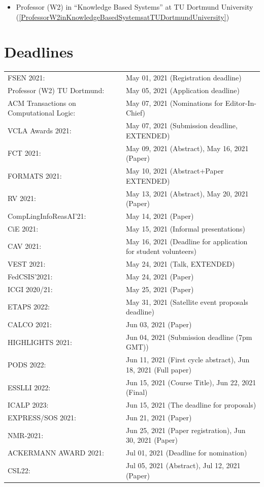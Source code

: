 \documentclass[prodmode,acmtecs]{acmsmall} %
\begin{document}
\begin{itemize}
\begin{itemize}\item Professor (W2) in “Knowledge Based Systems” at TU Dortmund University (\cref{ProfessorW2inKnowledgeBasedSystemsatTUDortmundUniversity})
\end{itemize} 
\end{itemize}\section{Deadlines}\label{deadlines}\begin{tabulary}{\linewidth}{LL}FSEN 2021:  & May 01, 2021 (Registration deadline) \\
Professor (W2) TU Dortmund:  & May 05, 2021 (Application deadline) \\
ACM Transactions on Computational Logic:  & May 07, 2021 (Nominations for Editor-In-Chief) \\
VCLA Awards 2021:  & May 07, 2021 (Submission deadline, EXTENDED) \\
FCT 2021:  & May 09, 2021 (Abstract), May 16, 2021 (Paper) \\
FORMATS 2021:  & May 10, 2021 (Abstract+Paper EXTENDED) \\
RV 2021:  & May 13, 2021 (Abstract), May 20, 2021 (Paper) \\
CompLingInfoReasAI'21:  & May 14, 2021 (Paper) \\
CiE 2021:  & May 15, 2021 (Informal presentations) \\
CAV 2021:  & May 16, 2021 (Deadline for application for student volunteers) \\
VEST 2021:  & May 24, 2021 (Talk, EXTENDED) \\
FedCSIS’2021:  & May 24, 2021 (Paper) \\
ICGI 2020/21:  & May 25, 2021 (Paper) \\
ETAPS 2022:  & May 31, 2021 (Satellite event proposals deadline) \\
CALCO 2021:  & Jun 03, 2021 (Paper) \\
HIGHLIGHTS 2021:  & Jun 04, 2021 (Submission deadline (7pm GMT)) \\
PODS 2022:  & Jun 11, 2021 (First cycle abstract), Jun 18, 2021 (Full paper) \\
ESSLLI 2022:  & Jun 15, 2021 (Course Title), Jun 22, 2021 (Final) \\
ICALP 2023:  & Jun 15, 2021 (The deadline for proposals) \\
EXPRESS/SOS 2021:  & Jun 21, 2021 (Paper) \\
NMR-2021:  & Jun 25, 2021 (Paper registration), Jun 30, 2021 (Paper) \\
ACKERMANN AWARD 2021:  & Jul 01, 2021 (Deadline for nomination) \\
CSL22:  & Jul 05, 2021 (Abstract), Jul 12, 2021 (Paper) \\
\end{tabulary}
\end{document}
